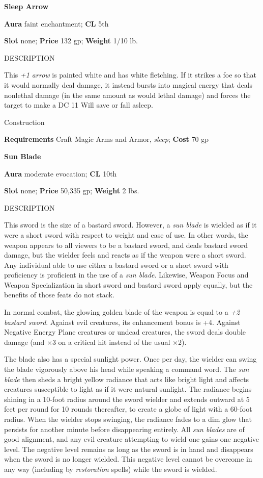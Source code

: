 \textbf{Sleep Arrow}
				
\textbf{Aura} faint enchantment;\textbf{ CL }5th
				
\textbf{Slot} none; \textbf{Price} 132 gp; \textbf{Weight} 1/10 lb.
				
DESCRIPTION
				
This \textit{+1 arrow} is painted white and has white fletching. If it strikes a foe so that it would normally deal damage, it instead bursts into magical energy that deals nonlethal damage (in the same amount as would lethal damage) and forces the target to make a DC 11 Will save or fall asleep. 
				
Construction
				
\textbf{Requirements} Craft Magic Arms and Armor, \textit{sleep}; \textbf{Cost }70 gp
				
\textbf{Sun Blade}
				
\textbf{Aura} moderate evocation;\textbf{ CL }10th
				
\textbf{Slot} none; \textbf{Price} 50,335 gp; \textbf{Weight} 2 lbs.
				
DESCRIPTION
				
This sword is the size of a bastard sword. However, a \textit{sun blade} is wielded as if it were a short sword with respect to weight and ease of use. In other words, the weapon appears to all viewers to be a bastard sword, and deals bastard sword damage, but the wielder feels and reacts as if the weapon were a short sword. Any individual able to use either a bastard sword or a short sword with proficiency is proficient in the use of a \textit{sun blade}. Likewise, Weapon Focus and Weapon Specialization in short sword and bastard sword apply equally, but the benefits of those feats do not stack.
				
In normal combat, the glowing golden blade of the weapon is equal to a \textit{+2 bastard sword}. Against evil creatures, its enhancement bonus is +4. Against Negative Energy Plane creatures or undead creatures, the sword deals double damage (and \mbox{$\times$}3 on a critical hit instead of the usual \mbox{$\times$}2).
				
The blade also has a special sunlight power. Once per day, the wielder can swing the blade vigorously above his head while speaking a command word. The \textit{sun blade} then sheds a bright yellow radiance that acts like bright light and affects creatures susceptible to light as if it were natural sunlight. The radiance begins shining in a 10-foot radius around the sword wielder and extends outward at 5 feet per round for 10 rounds thereafter, to create a globe of light with a 60-foot radius. When the wielder stops swinging, the radiance fades to a dim glow that persists for another minute before disappearing entirely. All \textit{sun blades} are of good alignment, and any evil creature attempting to wield one gains one negative level. The negative level remains as long as the sword is in hand and disappears when the sword is no longer wielded. This negative level cannot be overcome in any way (including by \textit{restoration} spells) while the sword is wielded. 
				
